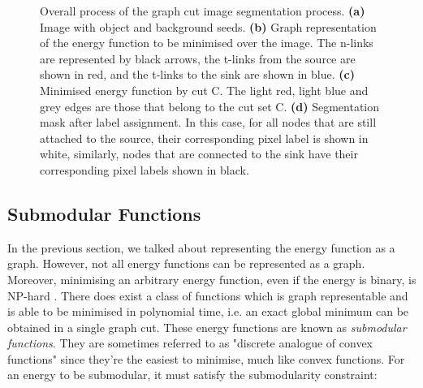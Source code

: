 \begin{figure}[!t]
	\centering
	\caption{Overall process of the graph cut image segmentation process.
	\textbf{(a)} Image with object and background seeds.
	\textbf{(b)} Graph representation of the energy function to be minimised over the image. The n-links are represented by black arrows, the t-links from the source are shown in red, and the t-links to the sink are shown in blue.
	\textbf{(c)} Minimised energy function by cut C. The light red, light blue and grey edges are those that belong to the cut set C.
	\textbf{(d)} Segmentation mask after label assignment. In this case, for all nodes that are still attached to the source, their corresponding pixel label is shown in white, similarly, nodes that are connected to the sink have their corresponding pixel labels shown in black.}
	\label{fig:graphcut_process}
\end{figure}


\subsection{Submodular Functions}
\label{sec:SubmodularFunctions}

In the previous section, we talked about representing the energy function as a graph. However, not all energy functions can be represented as a graph. Moreover, minimising an arbitrary energy function, even if the energy is binary, is NP-hard \citep{Shimony1994}. There does exist a class of functions which is graph representable and is able to be minimised in polynomial time, i.e. an exact global minimum can be obtained in a single graph cut. These energy functions are known as \textit{submodular functions}. They are sometimes referred to as "discrete analogue of convex functions" since they're the easiest to minimise, much like convex functions. For an energy to be submodular, it must satisfy the submodularity constraint:

